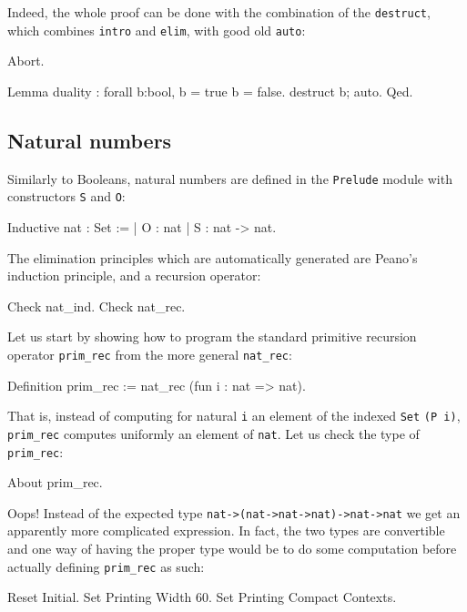 \documentclass[11pt,a4paper]{book}
\begin{document}
Indeed, the whole proof can be done with the combination of the
 \verb:destruct:, which combines \verb:intro: and \verb:elim:,
with good old \verb:auto::
\begin{coq_eval}
Abort.
\end{coq_eval}
\begin{coq_example}
Lemma duality : forall b:bool, b = true \/ b = false.
destruct b; auto.
Qed.
\end{coq_example}

\subsection{Natural numbers}

Similarly to Booleans, natural numbers are defined in the \verb:Prelude:
module with constructors \verb:S: and \verb:O::
\begin{coq_example}
Inductive nat : Set :=
  | O : nat
  | S : nat -> nat.
\end{coq_example}

The elimination principles which are automatically generated are Peano's
induction principle, and a recursion operator:
\begin{coq_example}
Check nat_ind.
Check nat_rec.
\end{coq_example}

Let us start by showing how to program the standard primitive recursion
operator \verb:prim_rec: from the more general \verb:nat_rec::
\begin{coq_example}
Definition prim_rec := nat_rec (fun i : nat => nat).
\end{coq_example}

That is, instead of computing for natural \verb:i: an element of the indexed
\verb:Set: \verb:(P i):, \verb:prim_rec: computes uniformly an element of 
\verb:nat:. Let us check the type of \verb:prim_rec::
\begin{coq_example}
About prim_rec.
\end{coq_example}

Oops! Instead of the expected type \verb+nat->(nat->nat->nat)->nat->nat+ we
get an apparently more complicated expression.
In fact, the two types are convertible and one way of having the proper
type would be to do some computation before actually defining \verb:prim_rec:
as such:

\begin{coq_eval}
Reset Initial.
Set Printing Width 60.
Set Printing Compact Contexts.
\end{coq_eval}
\end{document}
